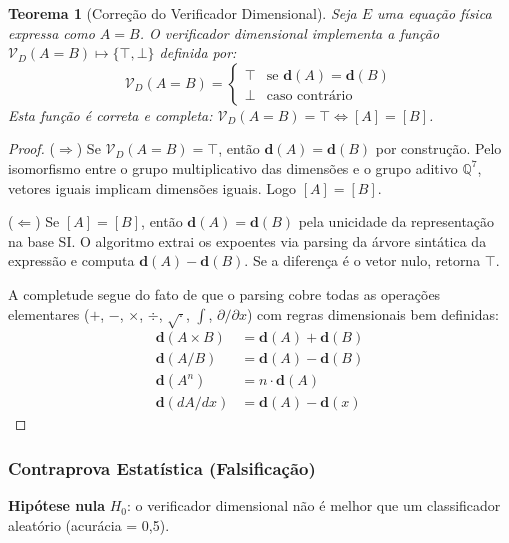 \documentclass[5p]{elsarticle}
\newtheorem{theorem}{Teorema}[section]
\theoremstyle{remark}
\begin{document}
\begin{theorem}[Correção do Verificador Dimensional]
Seja $E$ uma equação física expressa como $A = B$. O verificador dimensional implementa a função $\mathcal{V}_D(A = B) \mapsto \{\top, \bot\}$ definida por:
\begin{equation}
\mathcal{V}_D(A = B) = \begin{cases}
\top & \text{se } \mathbf{d}(A) = \mathbf{d}(B) \\
\bot & \text{caso contrário}
\end{cases}
\label{eq:c1_dimcheck}
\end{equation}
Esta função é correta e completa: $\mathcal{V}_D(A = B) = \top \iff [A] = [B]$.
\end{theorem}

\begin{proof}
($\Rightarrow$) Se $\mathcal{V}_D(A = B) = \top$, então $\mathbf{d}(A) = \mathbf{d}(B)$ por construção. Pelo isomorfismo entre o grupo multiplicativo das dimensões e o grupo aditivo $\mathbb{Q}^7$, vetores iguais implicam dimensões iguais. Logo $[A] = [B]$.

($\Leftarrow$) Se $[A] = [B]$, então $\mathbf{d}(A) = \mathbf{d}(B)$ pela unicidade da representação na base SI. O algoritmo extrai os expoentes via parsing da árvore sintática da expressão e computa $\mathbf{d}(A) - \mathbf{d}(B)$. Se a diferença é o vetor nulo, retorna $\top$.

A completude segue do fato de que o parsing cobre todas as operações elementares ($+$, $-$, $\times$, $\div$, $\sqrt{\cdot}$, $\int$, $\partial/\partial x$) com regras dimensionais bem definidas:
\begin{align}
\mathbf{d}(A \times B) &= \mathbf{d}(A) + \mathbf{d}(B) \\
\mathbf{d}(A / B) &= \mathbf{d}(A) - \mathbf{d}(B) \\
\mathbf{d}(A^n) &= n \cdot \mathbf{d}(A) \\
\mathbf{d}(dA/dx) &= \mathbf{d}(A) - \mathbf{d}(x)
\end{align}
\end{proof}

\subsubsection{Contraprova Estatística (Falsificação)}

\textbf{Hipótese nula} $H_0$: o verificador dimensional não é melhor que um classificador aleatório (acurácia = 0,5).
\end{document}
